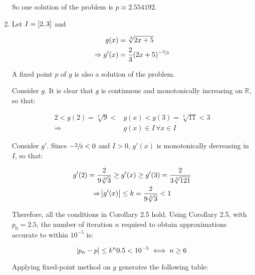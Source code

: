 \documentclass[../../../../Assignments]{subfiles}
\begin{document}
\begin{solution}
\begin{enumerate}[label = \alph*)]
            So one solution of the problem is \(p \approx \num{2.554192}\).

        \item Let \(I = \interval{2}{3}\) and

            \begin{align*}
                             g(x) &= \sqrt[3]{2x + 5} \\
                \Rightarrow g'(x) &= \dfrac{2}{3} (2x + 5)^{- \sfrac{2}{3}}
            \end{align*}

            A fixed point \(p\) of \(g\) is also a solution of the problem.

            Consider \(g\). It is clear that \(g\) is continuous and
            monotonically increasing on \(\mathbb{R}\), so that:

            \begin{align*}
                2 < g(2) = \sqrt[3]{9} < &g(x) < g(3) = \sqrt[3]{11} < 3 \\
                             \Rightarrow &g(x) \in I \, \forall x \in I
            \end{align*}

            Consider \(g'\). Since \(- \sfrac{2}{3} < 0\) and \(I > 0\),
            \(g'(x)\) is monotonically decreasing in \(I\), so that:

            \begin{gather*}
                g'(2) = \frac{2}{9 \sqrt[3]{3}} \geq g'(x) \geq g'(3) = \frac{2}{3 \sqrt[3]{121}} \\
                \Rightarrow \abs{g'(x)} \leq k = \frac{2}{9 \sqrt[3]{3}} < 1
            \end{gather*}

            Therefore, all the conditions in Corollary 2.5 hold. Using Corollary
            2.5, with \(p_0 = \num{2.5}\), the number of iteration \(n\)
            required to obtain approximations accurate to within \(10^{-5}\) is:

            \[\abs{p_n - p} \leq k^n \num{0.5} < 10^{-5} \iff n \geq 6\]

            Applying fixed-point method on \(g\) generates the following table:


\end{enumerate}
\end{solution}
\end{document}
